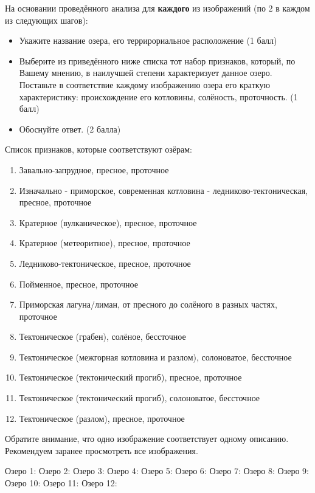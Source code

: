 
На основании проведённого анализа для \textbf{каждого} из изображений (по 2 в каждом из следующих шагов):
\begin{itemize}
    \item Укажите название озера, его террирориальное расположение (1 балл)
    \item Выберите из приведённого ниже списка тот набор признаков, который, по Вашему мнению, в наилучшей степени характеризует данное озеро. Поставьте в соответствие каждому изображению озера его краткую характеристику: происхождение его котловины, солёность, проточность. (1 балл)
    \item Обоснуйте ответ. (2 балла)
\end{itemize}

Список признаков, которые соответствуют озёрам:
\begin{enumerate}
    \item Завально-запрудное, пресное, проточное
    \item Изначально - приморское, современная котловина - ледниково-тектоническая, пресное, проточное
    \item Кратерное (вулканическое), пресное, проточное
    \item Кратерное (метеоритное), пресное, проточное
    \item Ледниково-тектоническое, пресное, проточное
    \item Пойменное, пресное, проточное
    \item Приморская лагуна/лиман, от пресного до солёного в разных частях, проточное
    \item Тектоническое (грабен), солёное, бессточное
    \item Тектоническое (межгорная котловина и разлом), солоноватое, бессточное
    \item Тектоническое (тектонический прогиб), пресное, проточное
    \item Тектоническое (тектонический прогиб), солоноватое, бессточное
    \item Тектоническое (разлом), пресное, проточное
\end{enumerate}

Обратите внимание, что одно изображение соответствует одному описанию. Рекомендуем заранее просмотреть все изображения.

Озеро 1:
Озеро 2:
Озеро 3:
Озеро 4:
\newpage
Озеро 5:
Озеро 6:
Озеро 7:
\newpage
Озеро 8:
Озеро 9:
Озеро 10:
\newpage
Озеро 11:
Озеро 12:
